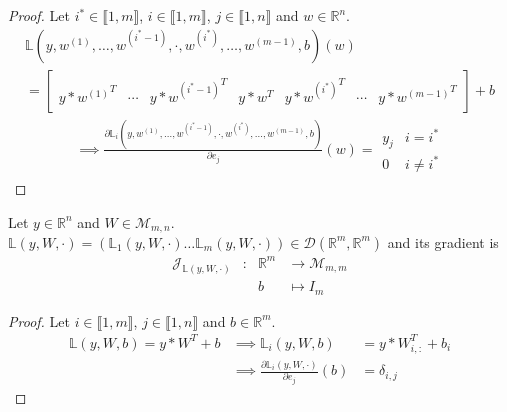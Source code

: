 \documentclass[11pt,en]{elegantpaper}
\newcommand{\Real}{\mathbb{R}}
\begin{document}
\begin{proof}
  Let $i^* \in \llbracket 1,m \rrbracket$, $i \in \llbracket 1,m \rrbracket$, $j \in \llbracket 1,n \rrbracket$ and $w \in \Real^n$. \begin{equation*}
    \begin{gathered}
      \mathbb{L}(y,w^{(1)},\ldots,w^{(i^*-1)},\cdot,w^{(i^*)},\ldots,w^{(m-1)},b)(w) \\
      = \begin{bmatrix}
        y * {w^{(1)}}^T &
        \cdots &
        y * {w^{(i^*-1)}}^T &
        y * w^T &
        y * {w^{(i^*)}}^T &
        \cdots &
        y * {w^{(m-1)}}^T
      \end{bmatrix} + b
    \end{gathered}
  \end{equation*}
  \begin{equation*}
    \begin{gathered}
      \implies \frac{\partial \mathbb{L}_i(y,w^{(1)},\ldots,w^{(i^*-1)},\cdot,w^{(i^*)},\ldots,w^{(m-1)},b)}{\partial e_j} (w) = \begin{array}{ll}
        y_j & i = i^* \\
        0 & i \neq i^*
      \end{array}
    \end{gathered}
  \end{equation*}
\end{proof}

\begin{proposition}
  {\normalfont
    Let $y \in \Real^n$ and $W \in \mathcal{M}_{m,n}$.
    $\mathbb{L}(y,W,\cdot) = (\mathbb{L}_1(y,W,\cdot) \ldots \mathbb{L}_m(y,W,\cdot)) \in \mathcal{D}(\Real^m, \Real^m)$
    and its gradient is \begin{equation} \label{prop:densel_b_differential}
      \begin{array}{llll}
        \mathcal{J}_{\mathbb{L}(y,W,\cdot)} & : & \Real^m  & \longrightarrow \mathcal{M}_{m,m} \\
        &   & b & \longmapsto I_m
      \end{array}
    \end{equation}
  }
\end{proposition}

\begin{proof}
  Let $i \in \llbracket 1,m \rrbracket$, $j \in \llbracket 1,n \rrbracket$
  and $b \in \Real^m$. \begin{equation*}
    \begin{array}{lll}
      \mathbb{L}(y,W,b) = y * W^T + b & \implies \mathbb{L}_i(y,W,b) & = y * W_{i,:}^T + b_i \\
      & \implies \frac{\partial \mathbb{L}_i(y,W,\cdot)}{\partial e_j} (b) & = \delta_{i,j}
    \end{array}
  \end{equation*}
\end{proof}
\end{document}
